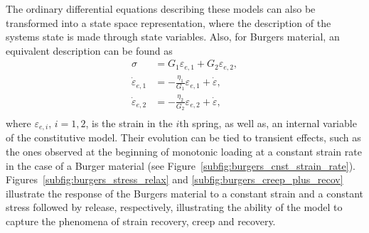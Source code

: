 The ordinary differential equations describing these models can also be transformed into a state space representation, where the description of the systems state is made through state variables.
Also, for Burgers material, an equivalent description can be found as
\begin{align}
\label{eq:state_var_desc_burgers}
	\sigma &= G_1\varepsilon_{e,1} + G_2\varepsilon_{e,2},\\
	\dot \varepsilon_{e,1} &= -\frac{\eta_1}{G_1}\varepsilon_{e,1} + \dot \varepsilon,\\
	\dot \varepsilon_{e,2} &= -\frac{\eta_2}{G_2}\varepsilon_{e,2} + \dot \varepsilon,\\
\end{align}
where $\varepsilon_{e,i}$, $i=1,2$, is the strain in the $i$th spring, as well as, an internal variable of the constitutive model.
Their evolution can be tied to transient effects, such as the ones observed at the beginning of monotonic loading at a constant strain rate in the case of a Burger material (see Figure~\ref{subfig:burgers_cnst_strain_rate}).
Figures~\ref{subfig:burgers_stress_relax} and \ref{subfig:burgers_creep_plus_recov} illustrate the response of the Burgers material to a constant strain and a constant stress followed by release, respectively, illustrating the ability of the model to capture the phenomena of strain recovery, creep and recovery.
